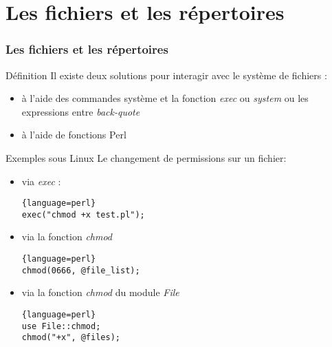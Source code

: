 \section{Les fichiers et les répertoires}

\begin{frame}[fragile]
  \frametitle{Les fichiers et les répertoires}

  \begin{block}{Définition}
    Il existe deux solutions pour interagir avec le système de fichiers :
    \begin{itemize}
    \item à l'aide des commandes système et la fonction \textit{exec} ou
      \textit{system} ou les expressions entre \textit{back-quote}
    \item à l'aide de fonctions Perl
    \end{itemize}
  \end{block}

  \begin{exampleblock}{Exemples sous Linux}
    Le changement de permissions sur un fichier:
    \begin{itemize}
    \item via \textit{exec} :
      \begin{lstlisting}{language=perl}
exec("chmod +x test.pl");
      \end{lstlisting}
    \item via la fonction \textit{chmod}
      \begin{lstlisting}{language=perl}
chmod(0666, @file_list);
      \end{lstlisting}
    \item via la fonction \textit{chmod} du module \textit{File}
      \begin{lstlisting}{language=perl}
use File::chmod;
chmod("+x", @files);
      \end{lstlisting}
    \end{itemize}
  \end{exampleblock}

\end{frame}
